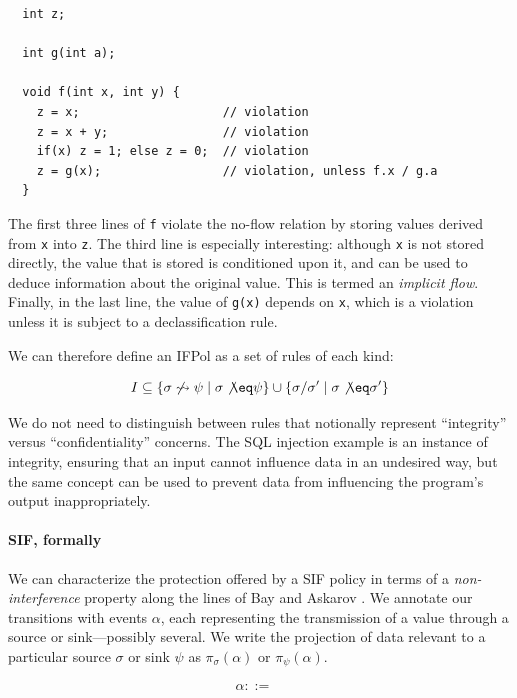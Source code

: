 \documentclass[acmsmall,review,anonymous]{acmart}\settopmatter{printfolios=true,printccs=false,printacmref=false}
\begin{document}
\begin{verbatim}
  int z;

  int g(int a);

  void f(int x, int y) {
    z = x;                    // violation
    z = x + y;                // violation
    if(x) z = 1; else z = 0;  // violation
    z = g(x);                 // violation, unless f.x / g.a
  }
\end{verbatim}

The first three lines of {\tt f} violate the no-flow relation by storing values derived from
{\tt x} into {\tt z}. The third line is especially interesting: although {\tt x} is not stored
directly, the value that is stored is conditioned upon it, and can be used to deduce information
about the original value. This is termed an {\em implicit flow}. Finally, in the last line,
the value of {\tt g(x)} depends on {\tt x}, which is a violation unless it is subject to a
declassification rule.

We can therefore define an IFPol as a set of rules of each kind:

\[I \subseteq \{\sigma \not \rightsquigarrow \psi \mid \sigma \not \eq \psi\} \cup
\{\sigma / \sigma' \mid \sigma \not \eq \sigma'\}\]

We do not need to distinguish between rules that notionally represent ``integrity'' versus ``confidentiality''
concerns. The SQL injection example is an instance of integrity, ensuring that an input cannot influence data
in an undesired way, but the same concept can be used to prevent data from influencing the program's output
inappropriately.

\paragraph{SIF, formally}

We can characterize the protection offered by a SIF policy in terms of a {\em non-interference}
property along the lines of Bay and Askarov \cite{}. We annotate our transitions with events \(\alpha\),
each representing the transmission of a value through a source or sink---possibly several. We write the
projection of data relevant to a particular source \(\sigma\) or sink \(\psi\) as \(\pi_\sigma(\alpha)\)
or \(\pi_\psi(\alpha)\).

\[\begin{aligned}
\alpha ::= & \\
& \\
\end{aligned}\]
\end{document}
